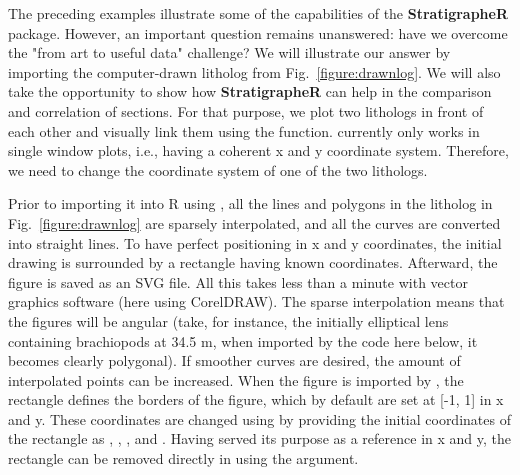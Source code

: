 The preceding examples illustrate some of the capabilities of the \textbf{StratigrapheR} package. However, an important question remains unanswered: have we overcome the "from art to useful data" challenge? We will illustrate our answer by importing the computer-drawn litholog from Fig.~\ref{figure:drawnlog}. We will also take the opportunity to show how \textbf{StratigrapheR} can help in the comparison and correlation of sections. For that purpose, we plot two lithologs in front of each other and visually link them using the  function.  currently only works in single window plots, i.e., having a coherent x and y coordinate system. Therefore, we need to change the coordinate system of one of the two lithologs.

Prior to importing it into R using , all the lines and polygons in the litholog in Fig.~\ref{figure:drawnlog} are sparsely interpolated, and all the curves are converted into straight lines. To have perfect positioning in x and y coordinates, the initial drawing is surrounded by a rectangle having known coordinates. Afterward, the figure is saved as an SVG file. All this takes less than a minute with vector graphics software (here using CorelDRAW). The sparse interpolation means that the figures will be angular (take, for instance, the initially elliptical lens containing brachiopods at 34.5 m, when imported by the code here below, it becomes clearly polygonal). If smoother curves are desired, the amount of interpolated points can be increased. When the figure is imported by , the rectangle defines the borders of the figure, which by default are set at [-1, 1] in x and y. These coordinates are changed using  by providing the initial coordinates of the rectangle as , , , and . Having served its purpose as a reference in x and y, the rectangle can be removed directly in  using the  argument.

